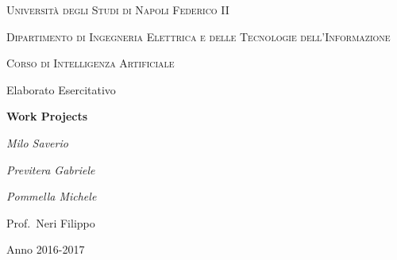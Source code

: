\documentclass[a4paper,11pt]{report}
\begin{document}
        
	\begin{titlepage}
		\centering
		{\scshape\huge Università degli Studi di Napoli Federico II \par}
		\vspace{1cm}
		{\scshape\large Dipartimento di Ingegneria Elettrica e delle Tecnologie dell'Informazione\par}
		\vspace{0.5cm}
		{\scshape\large Corso di Intelligenza Artificiale\par}
		\vspace{1.5cm}
		{\ttfamily\Large Elaborato Esercitativo\par}
		\vspace{0.5cm}
		{\huge\bfseries Work Projects\par}
		\vspace{2cm}
		{\Large\itshape Milo Saverio\par}
		{\Large\itshape Previtera Gabriele\par}
		{\Large\itshape Pommella Michele\par}
		\vspace{1.5cm}
		{\large Prof.~Neri Filippo\par}
		
		\vfill
		
		{\large Anno 2016-2017\par}
		
		
	\end{titlepage}
\end{document}
